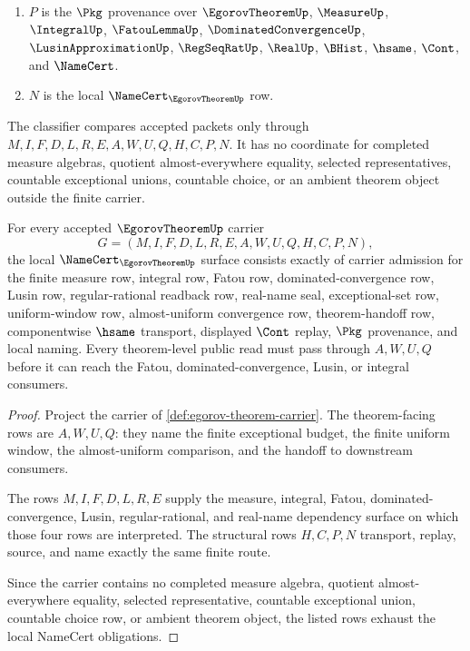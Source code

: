 \begin{definition}
\begin{enumerate}
$$$$
\item $P$ is the $\Pkg$ provenance over $\EgorovTheoremUp$, $\MeasureUp$, $\IntegralUp$, $\FatouLemmaUp$, $\DominatedConvergenceUp$, $\LusinApproximationUp$, $\RegSeqRatUp$, $\RealUp$, $\BHist$, $\hsame$, $\Cont$, and $\NameCert$.
\item $N$ is the local $\NameCert_{\EgorovTheoremUp}$ row.
\end{enumerate}
The classifier compares accepted packets only through $M,I,F,D,L,R,E,A,W,U,Q,H,C,P,N$. It has no coordinate for completed measure algebras, quotient almost-everywhere equality, selected representatives, countable exceptional unions, countable choice, or an ambient theorem object outside the finite carrier.
\end{definition}

\begin{theorem}
\label{thm:egorov-theorem-namecert-obligations}
For every accepted $\EgorovTheoremUp$ carrier
$$
G=(M,I,F,D,L,R,E,A,W,U,Q,H,C,P,N),
$$
the local $\NameCert_{\EgorovTheoremUp}$ surface consists exactly of carrier admission for the finite measure row, integral row, Fatou row, dominated-convergence row, Lusin row, regular-rational readback row, real-name seal, exceptional-set row, uniform-window row, almost-uniform convergence row, theorem-handoff row, componentwise $\hsame$ transport, displayed $\Cont$ replay, $\Pkg$ provenance, and local naming. Every theorem-level public read must pass through $A,W,U,Q$ before it can reach the Fatou, dominated-convergence, Lusin, or integral consumers.
\end{theorem}
\begin{proof}
Project the carrier of \autoref{def:egorov-theorem-carrier}. The theorem-facing rows are $A,W,U,Q$: they name the finite exceptional budget, the finite uniform window, the almost-uniform comparison, and the handoff to downstream consumers.

The rows $M,I,F,D,L,R,E$ supply the measure, integral, Fatou, dominated-convergence, Lusin, regular-rational, and real-name dependency surface on which those four rows are interpreted. The structural rows $H,C,P,N$ transport, replay, source, and name exactly the same finite route.

Since the carrier contains no completed measure algebra, quotient almost-everywhere equality, selected representative, countable exceptional union, countable choice row, or ambient theorem object, the listed rows exhaust the local NameCert obligations.
\end{proof}

